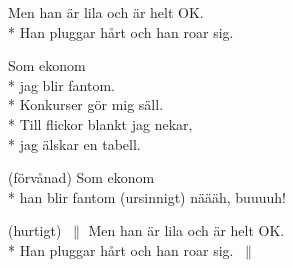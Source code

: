 \begin{SongText}
    \begin{SongVerse}
        Men han är lila och är helt OK.\\*%
        Han pluggar hårt och han roar sig.
    \end{SongVerse}
    \begin{SongVerse}
        Som ekonom\\*%
        jag blir fantom.\\*%
        Konkurser gör mig säll.\\*%
        Till flickor blankt jag nekar,\\*%
        jag älskar en tabell.
    \end{SongVerse}
    \begin{SongVerse}
        (förvånad) Som ekonom\\*%
        han blir fantom (ursinnigt) näääh, buuuuh!
    \end{SongVerse}
    \begin{SongVerse}
        (hurtigt) $\:\|$ Men han är lila och är helt OK.\\*%
        Han pluggar hårt och han roar sig. $\:\|$
    \end{SongVerse}
\end{SongText}
